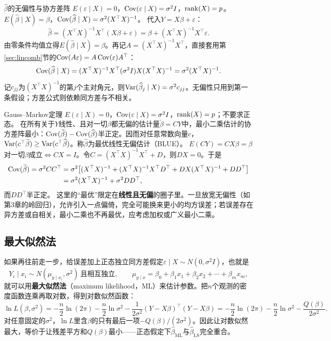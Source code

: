 \begin{derivation}{$\widehat\beta$的无偏性与协方差阵}
$E(\varepsilon\mid X)=0$，$\operatorname{Cov}(\varepsilon\mid X)=\sigma^2I$，$\operatorname{rank}(X)=p$。
$E(\widehat\beta\mid X)=\beta$，$\operatorname{Cov}(\widehat\beta\mid X)=\sigma^2(X^\top X)^{-1}$。
代入$Y=X\beta+\varepsilon$：
\[
\widehat\beta=(X^\top X)^{-1}X^\top(X\beta+\varepsilon)=\beta+(X^\top X)^{-1}X^\top\varepsilon .
\]
由零条件均值立得$E(\widehat\beta\mid X)=\beta$。再记$A=(X^\top X)^{-1}X^\top$，直接套用第\ref{sec:lincomb}节的$\operatorname{Cov}(A\varepsilon)=A\operatorname{Cov}(\varepsilon)A^\top$：
\[
\operatorname{Cov}(\widehat\beta\mid X)=(X^\top X)^{-1}X^\top(\sigma^2I)X(X^\top X)^{-1}=\sigma^2(X^\top X)^{-1}.
\]
记$c_{jj}$为$(X^\top X)^{-1}$的第$j$个主对角元，则$\operatorname{Var}(\widehat\beta_j\mid X)=\sigma^2c_{jj}$。无偏性只用到第一条假设；方差公式则依赖同方差与不相关。
\end{derivation}

\begin{derivation}{Gauss--Markov定理}
$E(\varepsilon\mid X)=0$，$\operatorname{Cov}(\varepsilon\mid X)=\sigma^2I$，$\operatorname{rank}(X)=p$；不要求正态。
在所有关于$Y$线性、且对一切$\beta$都无偏的估计量$\widetilde\beta=CY$中，最小二乘估计的协方差阵最小：$\operatorname{Cov}(\widetilde\beta)-\operatorname{Cov}(\widehat\beta)$半正定。因而对任意常数向量$c$，$\operatorname{Var}(c^\top\widetilde\beta)\ge\operatorname{Var}(c^\top\widehat\beta)$。称$\widehat\beta$为最优线性无偏估计（BLUE）。
$E(CY)=CX\beta=\beta$对一切$\beta$成立$\iff CX=I$。令$C=(X^\top X)^{-1}X^\top+D$，则$DX=0$。于是
\begin{align*}
\operatorname{Cov}(\widetilde\beta)=\sigma^2CC^\top
&=\sigma^2\bigl[(X^\top X)^{-1}+(X^\top X)^{-1}X^\top D^\top+DX(X^\top X)^{-1}+DD^\top\bigr]\\
&=\sigma^2(X^\top X)^{-1}+\sigma^2DD^\top ,
\end{align*}
而$DD^\top$半正定。
这里的“最优”限定在\textbf{线性且无偏}的圈子里。一旦放宽无偏性（如第3章的岭回归），允许引入一点偏倚，完全可能换来更小的均方误差；若误差存在异方差或自相关，最小二乘也不再最优，应考虑加权或广义最小二乘。
\end{derivation}

\subsection{最大似然法}
如果再往前走一步，给误差加上正态独立同方差假定$\varepsilon\mid X\sim N(0,\sigma^2I)$，也就是
\[
Y_i\mid x_i\sim N(\mu_{y\mid x_i},\sigma^2)\ \text{且相互独立},\qquad
\mu_{y\mid x}=\beta_0+\beta_1x_1+\beta_2x_2+\cdots+\beta_mx_m,
\]
就可以用\textbf{最大似然法}（maximum likelihood，ML）来估计参数。把$n$个观测的密度函数连乘再取对数，得到对数似然函数：
\[
\ln L(\beta,\sigma^2)=-\frac n2\ln(2\pi)-\frac n2\ln\sigma^2-\frac{1}{2\sigma^2}(Y-X\beta)^\top(Y-X\beta)
=-\frac n2\ln(2\pi)-\frac n2\ln\sigma^2-\frac{Q(\beta)}{2\sigma^2}.
\]
对任意固定的$\sigma^2$，$\ln L$里含$\beta$的只有最后一项$-Q(\beta)/(2\sigma^2)$。因此让对数似然最大，等价于让残差平方和$Q(\beta)$最小——正态假定下$\widehat\beta_{\mathrm{ML}}$与$\widehat\beta_{\mathrm{LS}}$完全重合。

